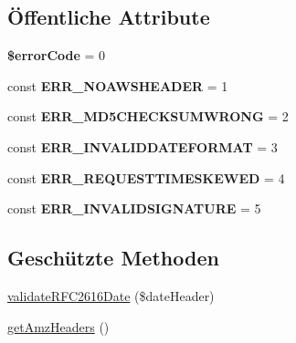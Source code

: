 \subsection*{Öffentliche Attribute}
\begin{DoxyCompactItemize}
\item 
\mbox{\label{class_sabre_1_1_h_t_t_p_1_1_auth_1_1_a_w_s_ae82ff53af1e930a9d405935fc98a90d6}} 
{\bfseries \$error\+Code} = 0
\item 
\mbox{\label{class_sabre_1_1_h_t_t_p_1_1_auth_1_1_a_w_s_a40ba3a5c46a2e4c56e74efe49b0311d4}} 
const {\bfseries E\+R\+R\+\_\+\+N\+O\+A\+W\+S\+H\+E\+A\+D\+ER} = 1
\item 
\mbox{\label{class_sabre_1_1_h_t_t_p_1_1_auth_1_1_a_w_s_ab57b6b83e91beec0af6add3e46a3efbf}} 
const {\bfseries E\+R\+R\+\_\+\+M\+D5\+C\+H\+E\+C\+K\+S\+U\+M\+W\+R\+O\+NG} = 2
\item 
\mbox{\label{class_sabre_1_1_h_t_t_p_1_1_auth_1_1_a_w_s_ad4809e61afb51af6b34071fae9becbfe}} 
const {\bfseries E\+R\+R\+\_\+\+I\+N\+V\+A\+L\+I\+D\+D\+A\+T\+E\+F\+O\+R\+M\+AT} = 3
\item 
\mbox{\label{class_sabre_1_1_h_t_t_p_1_1_auth_1_1_a_w_s_a119363978258021e7b03de115a7de7d4}} 
const {\bfseries E\+R\+R\+\_\+\+R\+E\+Q\+U\+E\+S\+T\+T\+I\+M\+E\+S\+K\+E\+W\+ED} = 4
\item 
\mbox{\label{class_sabre_1_1_h_t_t_p_1_1_auth_1_1_a_w_s_a872665d91d23aba8ba639ac3058b2601}} 
const {\bfseries E\+R\+R\+\_\+\+I\+N\+V\+A\+L\+I\+D\+S\+I\+G\+N\+A\+T\+U\+RE} = 5
\end{DoxyCompactItemize}
\subsection*{Geschützte Methoden}
\begin{DoxyCompactItemize}
\item 
\mbox{\hyperlink{class_sabre_1_1_h_t_t_p_1_1_auth_1_1_a_w_s_ada084fb0a402eee92b1a6e028b11c154}{validate\+R\+F\+C2616\+Date}} (\$date\+Header)
\item 
\mbox{\hyperlink{class_sabre_1_1_h_t_t_p_1_1_auth_1_1_a_w_s_a05192193b8766a7524dbe902f0e52aba}{get\+Amz\+Headers}} ()
\end{DoxyCompactItemize}
